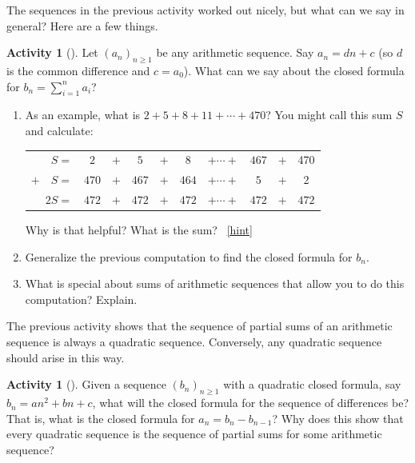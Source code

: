 \documentclass[10pt,]{book}
\theoremstyle{plain}
\theoremstyle{definition}
\theoremstyle{definition}
\theoremstyle{definition}
\newtheorem{activity}[project]{Activity}
\numberwithin{equation}{chapter}
\newcommand{\hrulethin}  {\noalign{\hrule height 0.04em}}
\begin{document}
\hypertarget{p-938}{}%
The sequences in the previous activity worked out nicely, but what can we say in general?  Here are a few things.%
\begin{activity}[]\label{activity-139}
\hypertarget{p-939}{}%
Let \((a_n)_{n \ge 1}\) be any arithmetic sequence.  Say \(a_n = dn + c\) (so \(d\) is the common difference and \(c = a_0\)).  What can we say about the closed formula for \(b_n = \sum_{i=1}^n a_i\)?%
\begin{enumerate}[font=\bfseries,label=(\alph*),ref=\alph*]
\item\label{task-179} \hypertarget{p-940}{}%
As an example, what is \(2+5+8+11+\cdots + 470\)?  You might call this sum \(S\) and calculate:%
\begin{sidebyside}{1}{0}{0}{0}
\begin{sbspanel}{1}
{\centering%
\begin{tabular}{rccccccccc}
\(S  =\)&\(2\)&\(+\)&\(5\)&\(+\)&\(8\)&\(+ \cdots +\)&\(467\)&\(+\)&470\tabularnewline[0pt]
\(+ \quad S  =\)&\(470\)&\(+\)&\(467\)&\(+\)&\(464\)&\(+ \cdots +\)&\(5\)&\(+\)&2\tabularnewline\hrulethin
\(2S  =\)&\(472\)&\(+\)&\(472\)&\(+\)&\(472\)&\(+ \cdots +\)&\(472\)&\(+\)&\(472\)
\end{tabular}
\par}
\end{sbspanel}
\end{sidebyside}
\par
\hypertarget{p-941}{}%
Why is that helpful?  What is the sum?%
~\hfill{\tiny\hyperlink{a-146.a}{[hint]}\hypertarget{q-146.a}{}}\item\label{task-180} \hypertarget{p-943}{}%
Generalize the previous computation to find the closed formula for \(b_n\).%
\item\label{task-181} \hypertarget{p-944}{}%
What is special about sums of arithmetic sequences that allow you to do this computation?  Explain.%
\end{enumerate}
\end{activity}
\hypertarget{p-945}{}%
The previous activity shows that the sequence of partial sums of an arithmetic sequence is always a quadratic sequence.  Conversely, any quadratic sequence should arise in this way.%
\begin{activity}[]\label{activity-140}
\hypertarget{p-946}{}%
Given a sequence \((b_n)_{n \ge 1}\) with a quadratic closed formula, say \(b_n = an^2 + bn + c\), what will the closed formula for the sequence of differences be?  That is, what is the closed formula for \(a_n = b_n - b_{n-1}\)?  Why does this show that every quadratic sequence is the sequence of partial sums for some arithmetic sequence?%
\end{activity}
\end{document}
